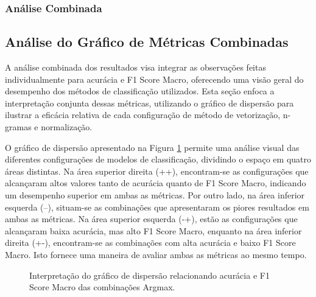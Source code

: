 \subsubsection{Análise Combinada}

\subsection{Análise do Gráfico de Métricas Combinadas}

A análise combinada dos resultados visa integrar as observações feitas individualmente para acurácia e F1 Score Macro, oferecendo uma visão geral do desempenho dos métodos de classificação utilizados. Esta seção enfoca a interpretação conjunta dessas métricas, utilizando o gráfico de dispersão para ilustrar a eficácia relativa de cada configuração de método de vetorização, n-gramas e normalização.

O gráfico de dispersão apresentado na Figura \ref{fig:scatter_acuracia_f1score_ilustracao} permite uma análise visual das diferentes configurações de modelos de classificação, dividindo o espaço em quatro áreas distintas. Na área superior direita (++), encontram-se as configurações que alcançaram altos valores tanto de acurácia quanto de F1 Score Macro, indicando um desempenho superior em ambas as métricas. Por outro lado, na área inferior esquerda (--), situam-se as combinações que apresentaram os piores resultados em ambas as métricas. Na área superior esquerda (-+), estão as configurações que alcançaram baixa acurácia, mas alto F1 Score Macro, enquanto na área inferior direita (+-), encontram-se as combinações com alta acurácia e baixo F1 Score Macro. Isto fornece uma maneira de avaliar ambas as métricas ao mesmo tempo.


\begin{figure}[htbp]
    \centering
\caption{Interpretação do gráfico de dispersão relacionando acurácia e F1 Score Macro das combinações Argmax.}
    \label{fig:scatter_acuracia_f1score_ilustracao}
\end{figure}

